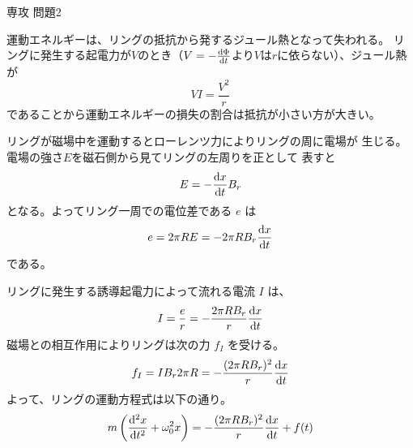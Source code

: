\documentclass[fleqn]{jbook}
\begin{document}
\begin{answer}{専攻 問題2}{}


\begin{subanswers}
\SubAnswer
  運動エネルギーは、リングの抵抗から発するジュール熱となって失われる。
  リングに発生する起電力が$V$のとき（$V=-{\frac{{\rm d} \Phi}{{\rm d} t}}$より$V$は$r$に依らない）、ジュール熱が
  \[ VI = \frac{V^2}{r} \]
  であることから運動エネルギーの損失の割合は抵抗が小さい方が大きい。


\SubAnswer
  \begin{subsubanswers}
  \SubSubAnswer
    リングが磁場中を運動するとローレンツ力によりリングの周に電場が
    生じる。電場の強さ$E$を磁石側から見てリングの左周りを正として
    表すと
%
    \[ E = -{\frac{{\rm d} x}{{\rm d} t}} B_r \]
%
    となる。よってリング一周での電位差である $e$ は
%
    \[ e = 2 \pi R E = - 2 \pi R B_r {\frac{{\rm d} x}{{\rm d} t}} \]
%
    である。


  \SubSubAnswer
    リングに発生する誘導起電力によって流れる電流 $I$ は、
%
    \[ I = \frac{e}{r} = - \frac{2 \pi R B_r}{r} {\frac{{\rm d} x}{{\rm d} t}} \]
%
    磁場との相互作用によりリングは次の力 $f_I$ を受ける。
%
    \[f_I=I B_r 2 \pi R = -\frac{(2 \pi R B_r)^2}{r} {\frac{{\rm d} x}{{\rm d} t}} \]
%
    よって、リングの運動方程式は以下の通り。
%
    \[ m\left(\Deriver{^2 x}{t^2}+\omega_0^2 x\right)%
       = - \frac{ (2 \pi R B_r )^2 }{r} \Deriver{x}{t} + f(t) \]
%

  \end{subsubanswers}



\end{subanswers}
\end{answer}
\end{document}

